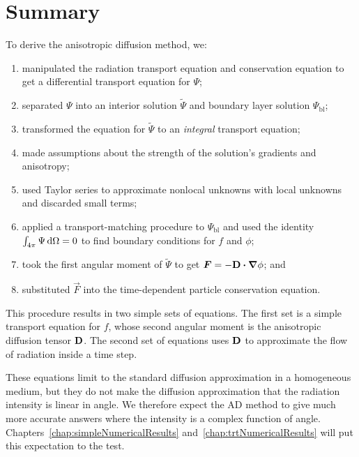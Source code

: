 \section{Summary}
To derive the anisotropic diffusion method, we:
\begin{enumerate}
  \item manipulated the radiation transport equation and conservation equation
    to get a differential transport equation for $\Psi$;
  \item separated $\Psi$ into an interior solution $\tilde \Psi$ and boundary
    layer solution $\Psi_\mathrm{bl}$;
  \item transformed the equation for $\tilde \Psi$ to an \emph{integral}
    transport equation;
  \item made assumptions about the strength of the solution's gradients and
    anisotropy;
  \item used Taylor series to approximate nonlocal unknowns with local
    unknowns and discarded small terms;
  \item applied a transport-matching procedure to $\Psi_\mathrm{bl}$ 
    and used the identity $\int_{4\pi} \Psi \mathop{}\!\mathrm{d}\Omega=0$ to find boundary
    conditions for $f$ and $\phi$;
  \item took the first angular moment of $\tilde \Psi$ to get
    $\bm{F}=-\mathbf{D} \bm{\cdot} \bm{\nabla} \phi$; and
  \item substituted $\vec{F}$ into the time-dependent particle conservation
    equation.
\end{enumerate}
This procedure results in two simple sets of equations. The first set
is a simple transport equation for $f$, whose second angular moment is
the anisotropic diffusion tensor $\mathbf{D}$. The second set of equations uses
$\mathbf{D}$ to approximate the flow of radiation inside a time step. 

These equations limit to the standard diffusion approximation in a homogeneous
medium, but they do not make the diffusion approximation that the radiation
intensity is linear in
angle. We therefore expect the AD method to give much more accurate answers
where the intensity is a complex function of angle.
Chapters~\ref{chap:simpleNumericalResults}
and~\ref{chap:trtNumericalResults} will put this expectation to the test.

